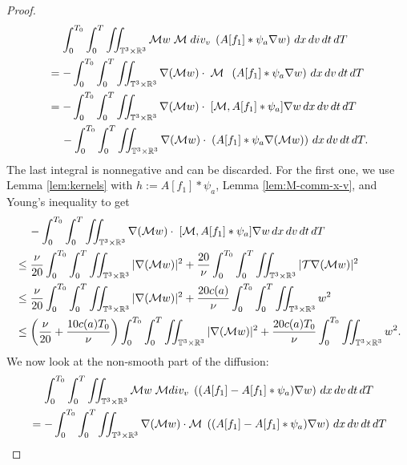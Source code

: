 \documentclass[10pt,a4paper]{amsart}
\newcommand{\R}{\mathbb R}
\newcommand{\T}{\mathbb{T}}
\newcommand{\dT}{\, {\rm d} T}
\newcommand{\dt}{\, {\rm d} t}
\newcommand{\dv}{\, {\rm d} v}
\newcommand{\dx}{\, {\rm d} x}
\begin{document}
\begin{proof}
\begin{align*}
& \quad \,
\int_0^{T_0}\int_0^{T} \iint_{\T^3 \times \R^3} \mathcal{M} w \; \mathcal{M} \; \textrm{div}_v \;\left( A[f_1]\ast \psi_a \nabla w \right)\dx\dv\dt\dT 
\\
&= -\int_0^{T_0}\int_0^{T} \iint_{\T^3 \times \R^3}  \nabla(\mathcal{M} w) \cdot  \; \mathcal{M} \; \;\left( A[f_1]\ast \psi_a \nabla w \right) \dx\dv\dt\dT 
\\
&= -\int_0^{T_0}\int_0^{T} \iint_{\T^3 \times \R^3}  \nabla(\mathcal{M} w) \cdot  \; [\mathcal{M}, A[f_1]\ast \psi_a] \nabla w \dx\dv\dt\dT
\\
& \quad \,
 -\int_0^{T_0}\int_0^{T} \iint_{\T^3 \times \R^3}  \nabla(\mathcal{M} w) \cdot  \; \left( A[f_1]\ast \psi_a \nabla (\mathcal{M}w) \right) \dx\dv\dt\dT.
\end{align*}
The last integral is nonnegative and can be discarded. For the first one, we use  Lemma \ref{lem:kernels} with $h:= A[f_1]\ast \psi_a$, Lemma \ref{lem:M-comm-x-v}, and Young's inequality to get 
\begin{align*}
& \quad \,
-\int_0^{T_0}\int_0^{T} \iint_{\T^3 \times \R^3}  \nabla(\mathcal{M} w) \cdot  \; [\mathcal{M}, A[f_1]\ast \psi_a] \nabla w \dx\dv\dt\dT 
\\
& \leq 
\frac{\nu}{20}\int_0^{T_0}\int_0^{T} \iint_{\T^3 \times \R^3}  |\nabla(\mathcal{M} w)|^2 %
+ \frac{20}{\nu}\int_0^{T_0}\int_0^{T} \iint_{\T^3 \times \R^3} |\mathcal{T} \nabla  (\mathcal{M}w )|^2 
\\
& \leq 
\frac{\nu}{20}\int_0^{T_0}\int_0^{T} \iint_{\T^3 \times \R^3}  
|\nabla(\mathcal{M} w)|^2 %
+ \frac{20 c(a) }{\nu}\int_0^{T_0}\int_0^{T} \iint_{\T^3 \times \R^3} w^2 
\\
&\le \left( \frac{\nu}{20} +  \frac{10 c(a)T_0 }{\nu}\right)  \int_0^{T_0}\int_0^{T} \iint_{\T^3 \times \R^3}  
|\nabla(\mathcal{M} w)|^2 %
+ \frac{20 c(a) T_0}{\nu}\int_0^{T_0}\iint_{\T^3 \times \R^3} 
w^2.
\end{align*}
We now look at the non-smooth part of the diffusion: 
\begin{align*}
& \quad \,
\int_0^{T_0}\int_0^{T} \iint_{\T^3 \times \R^3} 
\mathcal{M} w \; \mathcal{M}\textrm{div}_v \;\left( (A[f_1]-A[f_1]\ast \psi_a) \nabla w \right)\dx\dv\dt\dT
\\
&= - \int_0^{T_0}\int_0^{T} \iint_{\T^3 \times \R^3}  \nabla (\mathcal{M} w) \cdot \mathcal{M} \;\left( (A[f_1]-A[f_1]\ast \psi_a) \nabla w \right)\dx\dv\dt\dT

\end{align*}
\end{proof}
\end{document}
